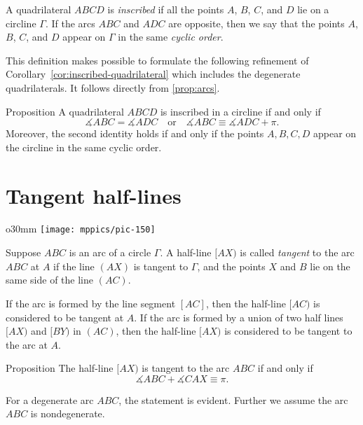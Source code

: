A quadrilateral $ABCD$ is 
\emph{inscribed}
if all the points $A$, $B$, $C$, and $D$ lie on a circline $\Gamma$.
If the arcs $ABC$ and $ADC$ are opposite, then we say that the points $A$, $B$, $C$, and $D$ appear on $\Gamma$ in the same \emph{cyclic order}.

This definition makes possible to formulate the following refinement of Corollary~\ref{cor:inscribed-quadrilateral} which includes the degenerate quadrilaterals.
It follows directly from \ref{prop:arcs}.

\begin{thm}{Proposition}\label{prop:inscribed-quadrilateral}
A quadrilateral $ABCD$ is inscribed in a circline if and only if 
\[\measuredangle ABC=\measuredangle ADC\quad\text{or}\quad \measuredangle ABC\equiv\measuredangle ADC+\pi.\]
Moreover, the second identity holds if and only if the points $A,B,C,D$ appear on the circline in the same cyclic order.
\end{thm}


\section*{Tangent half-lines}

\begin{wrapfigure}{o}{30mm}
\centering
\texttt{[image: mppics/pic-150]}
\end{wrapfigure}

Suppose $ABC$ is an arc of a circle $\Gamma$.
A half-line $[AX)$ is called 
\emph{tangent} 
to the arc $ABC$ at $A$
if the line $(AX)$ is tangent to $\Gamma$, and the points $X$ and $B$ lie on the same side of the line $(AC)$.

If the arc is formed by the line segment $[AC]$, then the half-line $[AC)$ is considered to be tangent at $A$.
If the arc is formed by a union of two half lines $[AX)$ and $[BY)$ in $(AC)$,
then the half-line $[AX)$ is considered to be tangent to the arc at $A$.

\begin{thm}{Proposition}\label{prop:arc(angle=tan)}
The half-line $[AX)$ is tangent to the arc $ABC$ if and only if 
$$\measuredangle ABC+\measuredangle CAX\equiv \pi.$$

\end{thm}

For a degenerate arc $ABC$, 
the statement is evident.
Further we assume the arc $ABC$ is nondegenerate.

